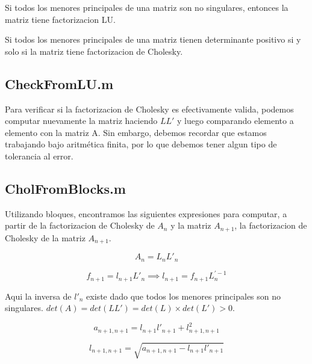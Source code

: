 \documentclass[10pt,a4paper]{article}
\begin{document}
Si todos los menores principales de una matriz son no singulares, entonces la matriz tiene factorizacion LU.

Si todos los menores principales de una matriz tienen determinante positivo si y solo si la matriz tiene factorizacion de Cholesky.

\subsection{CheckFromLU.m}

Para verificar si la factorizacion de Cholesky es efectivamente valida, podemos computar nuevamente la matriz haciendo $LL'$ y luego comparando elemento a elemento con la matriz A. Sin embargo, debemos recordar que estamos trabajando bajo aritmética finita, por lo que debemos tener algun tipo de tolerancia al error.

\subsection{CholFromBlocks.m}

Utilizando bloques, encontramos las siguientes expresiones para computar, a partir de la factorizacion de Cholesky de $A_n$ y la matriz $A_{n+1}$, la factorizacion de Cholesky de la matriz $A_{n+1}$.

\begin{equation}
A_n = L_n L'_n
\end{equation}

\begin{equation}
f_{n+1} = l_{n+1} L'_n \implies l_{n+1} = f_{n+1} L_n^{'-1}
\end{equation}

Aqui la inversa de $l'_n$ existe dado que todos los menores principales son no singulares. $det(A) = det(LL') = det(L) \times det(L') > 0$.

\begin{equation}
a_{n+1,n+1} = l_{n+1} l'_{n+1} + l_{n+1,n+1}^2
\end{equation}

\begin{equation}
l_{n+1,n+1} = \sqrt{a_{n+1,n+1} - l_{n+1} l'_{n+1}}
\end{equation}
\end{document}
